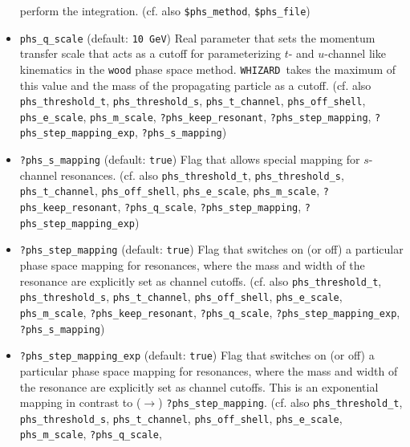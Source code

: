 \documentclass[12pt]{book}
\newcommand{\ttt}[1]{\texttt{#1}}
\newcommand{\whizard}{\texttt{WHIZARD}}
\begin{document}
\begin{itemize}
perform the integration. (cf. also \ttt{\$phs\_method},
\ttt{\$phs\_file}) 
\item
\ttt{phs\_q\_scale} \qquad (default: \ttt{10 GeV}) \newline
Real parameter that sets the momentum transfer scale that acts as a
cutoff for parameterizing $t$- and $u$-channel like kinematics in the
\ttt{wood} phase space method. \whizard\ takes the maximum of this
value and the mass of the propagating particle as a cutoff. (cf. also 
\ttt{phs\_threshold\_t}, \ttt{phs\_threshold\_s},
\ttt{phs\_t\_channel}, \ttt{phs\_off\_shell},  \ttt{phs\_e\_scale},
\ttt{phs\_m\_scale}, \ttt{?phs\_keep\_resonant},
\ttt{?phs\_step\_mapping}, \ttt{?phs\_step\_mapping\_exp}, 
\newline \ttt{?phs\_s\_mapping}) 
\item
\ttt{?phs\_s\_mapping} \qquad (default: \ttt{true}) \newline
Flag that allows special mapping for $s$-channel resonances. 
(cf. also \ttt{phs\_threshold\_t}, \ttt{phs\_threshold\_s},
\ttt{phs\_t\_channel}, \ttt{phs\_off\_shell},  \ttt{phs\_e\_scale},
\ttt{phs\_m\_scale}, \newline \ttt{?phs\_keep\_resonant},
\ttt{?phs\_q\_scale}, \ttt{?phs\_step\_mapping}, 
\ttt{?phs\_step\_mapping\_exp}) 
\item
\ttt{?phs\_step\_mapping} \qquad (default: \ttt{true}) \newline
Flag that switches on (or off) a particular phase space mapping for
resonances, where the mass and width of the resonance are explicitly
set as channel cutoffs. (cf. also 
\ttt{phs\_threshold\_t}, \ttt{phs\_threshold\_s},
\ttt{phs\_t\_channel}, \ttt{phs\_off\_shell},  \ttt{phs\_e\_scale},
\newline \ttt{phs\_m\_scale}, \ttt{?phs\_keep\_resonant},
\ttt{?phs\_q\_scale}, \ttt{?phs\_step\_mapping\_exp}, 
\newline \ttt{?phs\_s\_mapping}) 
\item
\ttt{?phs\_step\_mapping\_exp} \qquad (default: \ttt{true}) \newline 
Flag that switches on (or off) a particular phase space mapping for
resonances, where the mass and width of the resonance are explicitly
set as channel cutoffs. This is an exponential mapping in contrast to
($\to$) \ttt{?phs\_step\_mapping}. (cf. also 
\ttt{phs\_threshold\_t}, \ttt{phs\_threshold\_s},
\ttt{phs\_t\_channel}, \ttt{phs\_off\_shell},  \ttt{phs\_e\_scale},
\ttt{phs\_m\_scale}, \newline \ttt{?phs\_q\_scale},

\end{itemize}
\end{document}
